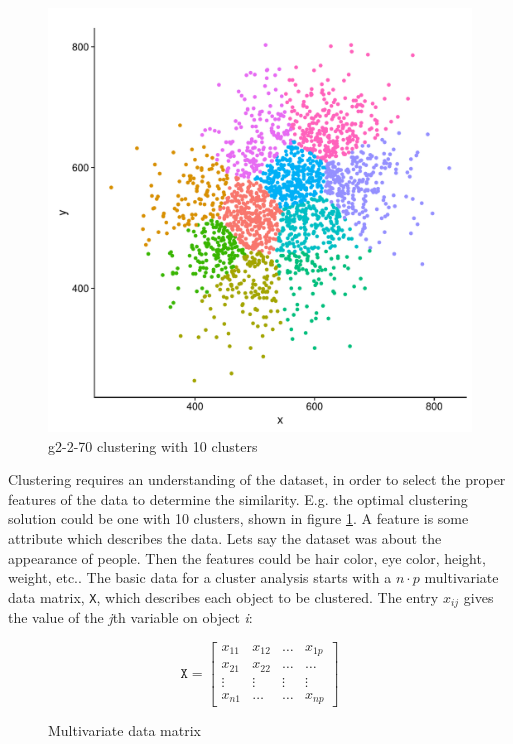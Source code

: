 \documentclass[a4paper,10pt]{article}
\theoremstyle{plain}
\theoremstyle{definition}
\begin{document}
\begin{figure}[H]
	\centering
	\includegraphics[scale=0.4]{./pictures/G2/g2-2-70-k10.pdf}
	\caption{g2-2-70 clustering with 10 clusters}
	\label{fig:g2-2-70-k10}
\end{figure}
Clustering requires an understanding of the dataset, in order to select the proper features of the data to determine the similarity. E.g. the optimal clustering solution could be one with 10 clusters, shown in figure \ref{fig:g2-2-70-k10}. A feature is some attribute which describes the data. Lets say the dataset was about the appearance of people. Then the features could be hair color, eye color, height, weight, etc..
The basic data for a cluster analysis starts with a $n \cdot p$ multivariate data matrix, \texttt{X}, which describes each object to be clustered. The entry $x_{ij}$ gives the value of the \textit{j}th variable on object \textit{i}:
\begin{figure}[H]
	\centering
	\[
	\texttt{X}
	=
	\begin{bmatrix}
	x_{11} & x_{12} & \dots & x_{1p} \\
	x_{21} & x_{22} & \dots & \dots \\
	\vdots & \vdots & \vdots & \vdots \\
	x_{n1} & \dots & \dots & x_{np}
	\end{bmatrix}
	\]
	\caption{Multivariate data matrix}
	\label{fig:dataMatrix}
\end{figure}
\end{document}
